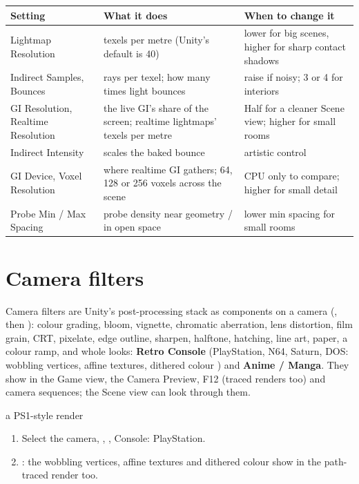 \begin{center}
\small
\begin{tabularx}{\textwidth}{lXX}
\toprule
Setting & What it does & When to change it \\
\midrule
Lightmap Resolution & texels per metre (Unity's default is 40) & lower for big scenes, higher for sharp contact shadows \\
Indirect Samples, Bounces & rays per texel; how many times light bounces & raise if noisy; 3 or 4 for interiors \\
GI Resolution, Realtime Resolution & the live GI's share of the screen; realtime lightmaps' texels per metre & Half for a cleaner Scene view; higher for small rooms \\
Indirect Intensity & scales the baked bounce & artistic control \\
GI Device, Voxel Resolution & where realtime GI gathers; 64, 128 or 256 voxels across the scene & CPU only to compare; higher for small detail \\
Probe Min / Max Spacing & probe density near geometry / in open space & lower min spacing for small rooms \\
\bottomrule
\end{tabularx}
\end{center}

\section{Camera filters}
Camera filters are Unity's post-processing stack as components on a camera (,
then ): colour grading, bloom, vignette, chromatic aberration, lens distortion, film grain, CRT,
pixelate, edge outline, sharpen, halftone, hatching, line art, paper, a colour ramp, and whole looks: \textbf{Retro
Console} (PlayStation, N64, Saturn, DOS: wobbling vertices, affine textures, dithered colour \cite{psxspx}) and
\textbf{Anime / Manga}. They show in the Game view, the Camera Preview, F12 (traced renders too) and camera sequences;
the Scene view can look through them.

\begin{example}{a PS1-style render}
\begin{enumerate}
  \item Select the camera, , , Console: PlayStation.
  \item {}: the wobbling vertices, affine textures and dithered colour show in the path-traced render too.
\end{enumerate}
\end{example}


